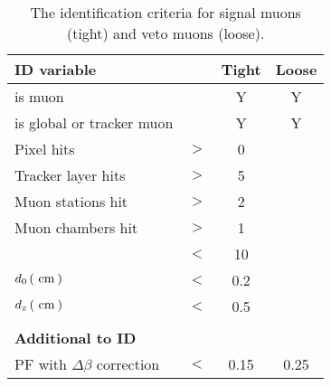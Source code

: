 \begin{table}[h!]
    \centering
    \caption{The identification criteria for signal muons (tight) and veto muons (loose).}
    \label{tb:muID}
    \begin{tabular}{lccc}
            \textbf{ID variable}      			&		&  \textbf{Tight}    & \textbf{Loose}  \\
            \hline
            is \PF{} muon 				&		&	Y				 &	Y \\			
            is global or tracker muon 	&		&	Y				 &	Y \\	
            Pixel hits 					&	$>$	&	0				 &	\NA{} \\	
            Tracker layer hits 			&	$>$	&	5				 &	\NA{} \\	
            Muon stations hit           &   $>$ &   2                &  \NA{} \\    
            Muon chambers hit           &   $>$ &   1                &  \NA{} \\    
            \chisndf{}                  &   $<$ &   10               &  \NA{} \\
            $d_0\,(\mathrm{~cm}^{}\,)$ 					&	$<$	&	0.2		 &	\NA{} \\
            $d_z\,(\mathrm{~cm}^{}\,)$ 					&	$<$	&	0.5		 &	\NA{} \\
            \\
            \textbf{Additional to ID} & & & \\   
            \hline
            PF \Irel{} with $\Delta\beta$ correction   & $ < $ & 0.15  & 0.25  \\
    \end{tabular} \\
\end{table}


